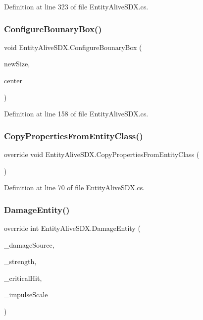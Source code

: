 Definition at line 323 of file Entity\+Alive\+S\+D\+X.\+cs.

\mbox{\label{class_entity_alive_s_d_x_a6daeef683d8ae8742fcf499bff7d8423}} 
\subsubsection{\texorpdfstring{ConfigureBounaryBox()}{ConfigureBounaryBox()}}
{\footnotesize\ttfamily void Entity\+Alive\+S\+D\+X.\+Configure\+Bounary\+Box (\begin{DoxyParamCaption}\item[{Vector3}]{new\+Size,  }\item[{Vector3}]{center }\end{DoxyParamCaption})}



Definition at line 158 of file Entity\+Alive\+S\+D\+X.\+cs.

\mbox{\label{class_entity_alive_s_d_x_a07b192b0584e38a9e4bc8423ad2a0a7c}} 
\subsubsection{\texorpdfstring{CopyPropertiesFromEntityClass()}{CopyPropertiesFromEntityClass()}}
{\footnotesize\ttfamily override void Entity\+Alive\+S\+D\+X.\+Copy\+Properties\+From\+Entity\+Class (\begin{DoxyParamCaption}{ }\end{DoxyParamCaption})}



Definition at line 70 of file Entity\+Alive\+S\+D\+X.\+cs.

\mbox{\label{class_entity_alive_s_d_x_a289eae1e8162bdd52315a3287b42dbbe}} 
\subsubsection{\texorpdfstring{DamageEntity()}{DamageEntity()}}
{\footnotesize\ttfamily override int Entity\+Alive\+S\+D\+X.\+Damage\+Entity (\begin{DoxyParamCaption}\item[{Damage\+Source}]{\+\_\+damage\+Source,  }\item[{int}]{\+\_\+strength,  }\item[{bool}]{\+\_\+critical\+Hit,  }\item[{float}]{\+\_\+impulse\+Scale }\end{DoxyParamCaption})}



